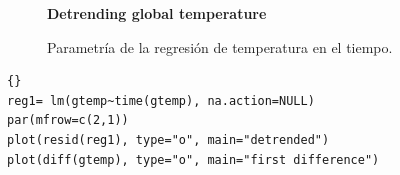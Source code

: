 \begin{figure}[p]
	\centering
	\textbf{Detrending global temperature}\par\medskip
	\caption{Parametría de la regresión de temperatura en el tiempo.}\label{fig2}
\end{figure}


\begin{lstlisting}[title={‘Código R: ejemplo 1 Regresando gtemp sobre tiempo.’},basicstyle=\ttfamily]{}
reg1= lm(gtemp~time(gtemp), na.action=NULL) 
par(mfrow=c(2,1))
plot(resid(reg1), type="o", main="detrended")
plot(diff(gtemp), type="o", main="first difference")
\end{lstlisting}

